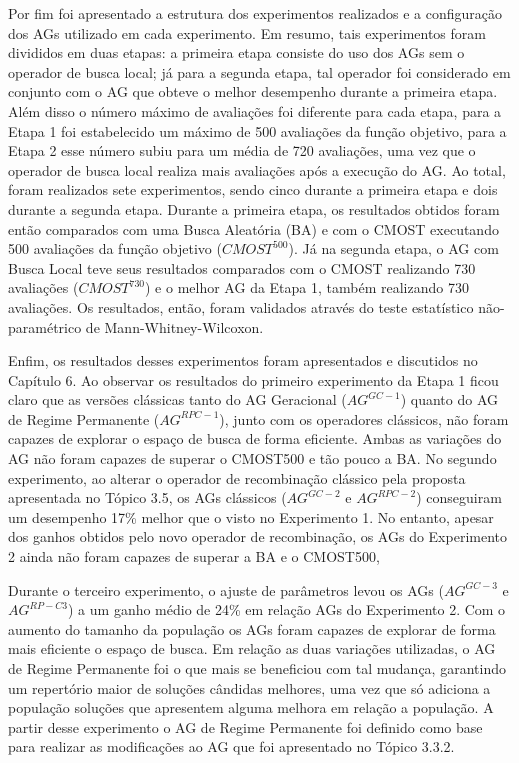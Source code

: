 Por fim foi apresentado a estrutura dos experimentos realizados e a configuração dos AGs utilizado em cada experimento. Em resumo, tais experimentos foram divididos em duas etapas: a primeira etapa consiste do uso dos AGs sem o operador de busca local; já para a segunda etapa, tal operador foi considerado em conjunto com o AG que obteve o melhor desempenho durante a primeira etapa. Além disso o número máximo de avaliações foi diferente para cada etapa, para a Etapa 1 foi estabelecido um máximo de 500 avaliações da função objetivo, para a Etapa 2 esse número subiu para um média de 720 avaliações, uma vez que o operador de busca local realiza mais avaliações após a execução do AG. Ao total, foram realizados sete experimentos, sendo cinco durante a primeira etapa e dois durante a segunda etapa. Durante a primeira etapa, os resultados obtidos foram então comparados com uma Busca Aleatória (BA) e com o CMOST executando 500 avaliações da função objetivo ($CMOST^{500}$). Já na segunda etapa, o AG com Busca Local teve seus resultados comparados com o CMOST realizando 730 avaliações ($CMOST^{730}$) e o melhor AG da Etapa 1, também realizando 730 avaliações. Os resultados, então, foram validados através do teste estatístico não-paramétrico de Mann-Whitney-Wilcoxon. 

Enfim, os resultados desses experimentos foram apresentados e discutidos no Capítulo 6. Ao observar os resultados do primeiro experimento da Etapa 1 ficou claro que as versões clássicas tanto do AG Geracional ($AG^{GC-1}$) quanto do AG de Regime Permanente ($AG^{RPC-1}$), junto com os operadores clássicos, não foram capazes de explorar o espaço de busca de forma eficiente.  Ambas as variações do AG não foram capazes de superar o CMOST500 e tão pouco a BA. No segundo experimento, ao alterar o operador de recombinação clássico pela proposta apresentada no Tópico 3.5, os AGs clássicos ($AG^{GC-2}$ e $AG^{RPC-2}$) conseguiram um desempenho 17\% melhor que o visto no Experimento 1. No entanto, apesar dos ganhos obtidos pelo novo operador de recombinação, os AGs do Experimento 2 ainda não foram capazes de superar a BA e o CMOST500, 

Durante o terceiro experimento, o ajuste de parâmetros levou os AGs ($AG^{GC-3}$ e $AG^{RP-C3}$) a um ganho médio de 24\% em relação AGs do Experimento 2. Com o aumento do tamanho da população os AGs foram capazes de explorar de forma mais eficiente o espaço de busca. Em relação as duas variações utilizadas, o AG de Regime Permanente foi o que mais se beneficiou com tal mudança, garantindo um repertório maior de soluções cândidas melhores, uma vez que só adiciona a população soluções que apresentem alguma melhora em relação a população. A partir desse experimento o AG de Regime Permanente foi definido como base para realizar as modificações ao AG que foi apresentado no Tópico 3.3.2. 

